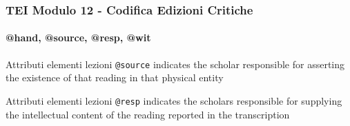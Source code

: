 \begin{frame}
    \frametitle{TEI Modulo 12 - Codifica Edizioni Critiche}
    \framesubtitle{@hand, @source, @resp, @wit}
    \addtocounter{nframe}{1}





    \begin{block}{Attributi elementi lezioni}
        \texttt{@source} indicates the scholar responsible for asserting the existence of that reading in that physical entity
    \end{block}

    \begin{block}{Attributi elementi lezioni}
         \texttt{@resp} indicates the scholars  responsible for supplying the intellectual content of the reading reported in the transcription
    \end{block}


\end{frame}











